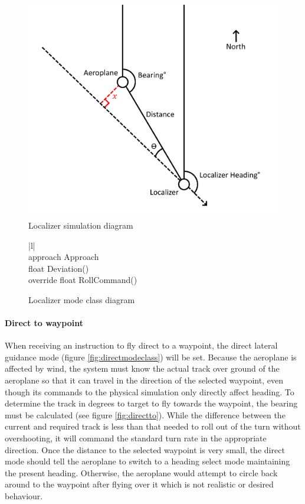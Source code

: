 \documentclass{article}
\begin{document}
\begin{figure}[H]
\centering
\includegraphics{diagrams/localizer.png}
\caption{\label{fig:localizer}Localizer simulation diagram}
\end{figure}

\begin{figure}[H]
\centering
\begin{tabular}{ |l| } 
\hline
{} \\
\hline
approach Approach \\
\hline
float Deviation() \\
override float RollCommand() \\
\hline
\end{tabular}
\caption{\label{fig:localizermodeclass}Localizer mode class diagram}
\end{figure}

\paragraph{Direct to waypoint}
When receiving an instruction to fly direct to a waypoint, the direct lateral guidance mode (figure \ref{fig:directmodeclass}) will be set.
Because the aeroplane is affected by wind, the system must know the actual track over ground of the aeroplane so that it can travel in the direction of the selected waypoint, even though its commands to the physical simulation only directly affect heading.
To determine the track in degrees to target to fly towards the waypoint, the bearing must be calculated (see figure \ref{fig:directto}).
While the difference between the current and required track is less than that needed to roll out of the turn without overshooting, it will command the standard turn rate in the appropriate direction.
Once the distance to the selected waypoint is very small, the direct mode should tell the aeroplane to switch to a heading select mode maintaining the present heading.
Otherwise, the aeroplane would attempt to circle back around to the waypoint after flying over it which is not realistic or desired behaviour.
\end{document}
